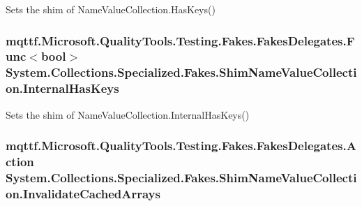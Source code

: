 Sets the shim of Name\-Value\-Collection.\-Has\-Keys()

\hypertarget{class_system_1_1_collections_1_1_specialized_1_1_fakes_1_1_shim_name_value_collection_a6c8d87337feea10337011d4aaa8fe3e3}{
\subsubsection[{Internal\-Has\-Keys}]{\setlength{\rightskip}{0pt plus 5cm}mqttf.\-Microsoft.\-Quality\-Tools.\-Testing.\-Fakes.\-Fakes\-Delegates.\-Func$<$bool$>$ System.\-Collections.\-Specialized.\-Fakes.\-Shim\-Name\-Value\-Collection.\-Internal\-Has\-Keys\hspace{0.3cm}{\ttfamily [set]}}}\label{class_system_1_1_collections_1_1_specialized_1_1_fakes_1_1_shim_name_value_collection_a6c8d87337feea10337011d4aaa8fe3e3}


Sets the shim of Name\-Value\-Collection.\-Internal\-Has\-Keys()

\hypertarget{class_system_1_1_collections_1_1_specialized_1_1_fakes_1_1_shim_name_value_collection_a2a3e86bbc2e7152a72eb70ec94097eec}{
\subsubsection[{Invalidate\-Cached\-Arrays}]{\setlength{\rightskip}{0pt plus 5cm}mqttf.\-Microsoft.\-Quality\-Tools.\-Testing.\-Fakes.\-Fakes\-Delegates.\-Action System.\-Collections.\-Specialized.\-Fakes.\-Shim\-Name\-Value\-Collection.\-Invalidate\-Cached\-Arrays\hspace{0.3cm}{\ttfamily [set]}}}\label{class_system_1_1_collections_1_1_specialized_1_1_fakes_1_1_shim_name_value_collection_a2a3e86bbc2e7152a72eb70ec94097eec}


